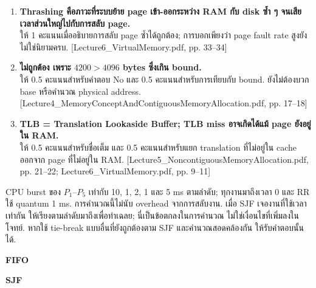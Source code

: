\begin{enumerate}[leftmargin=1.4em,start=6,itemsep=.25cm]
\item \textbf{Thrashing คือภาวะที่ระบบย้าย page เข้า-ออกระหว่าง RAM กับ disk ซ้ำ ๆ จนเสียเวลาส่วนใหญ่ไปกับการสลับ page.}\\ให้ 1 คะแนนเมื่ออธิบายการสลับ page ซ้ำได้ถูกต้อง; การบอกเพียงว่า page fault rate สูงยังไม่ใช่นิยามครบ. {\small [Lecture6\_VirtualMemory.pdf, pp. 33--34]}
\item \textbf{ไม่ถูกต้อง เพราะ $4200>4096$ bytes ซึ่งเกิน bound.}\\ให้ 0.5 คะแนนสำหรับคำตอบ No และ 0.5 คะแนนสำหรับการเทียบกับ bound. ยังไม่ต้องบวก base หรือคำนวณ physical address. {\small [Lecture4\_MemoryConceptAndContiguousMemoryAllocation.pdf, pp. 17--18]}
\item \textbf{TLB = Translation Lookaside Buffer; TLB miss อาจเกิดได้แม้ page ยังอยู่ใน RAM.}\\ให้ 0.5 คะแนนสำหรับชื่อเต็ม และ 0.5 คะแนนสำหรับแยก translation ที่ไม่อยู่ใน cache ออกจาก page ที่ไม่อยู่ใน RAM. {\small [Lecture5\_NoncontiguousMemoryAllocation.pdf, pp. 21--22; Lecture6\_VirtualMemory.pdf, pp. 9--11]}
\end{enumerate}\newpage{}
\noindent CPU burst ของ $P_1$--$P_5$ เท่ากับ 10, 1, 2, 1 และ 5 ms ตามลำดับ; ทุกงานมาถึงเวลา 0 และ RR ใช้ quantum 1 ms. การคำนวณนี้ไม่นับ overhead จากการสลับงาน. เมื่อ SJF เจองานที่ใช้เวลาเท่ากัน ให้เรียงตามลำดับมาถึงเพื่อทำเฉลย; นี่เป็นข้อตกลงในการคำนวณ ไม่ใช่เงื่อนไขที่เพิ่มลงในโจทย์. หากใช้ tie-break แบบอื่นที่ยังถูกต้องตาม SJF และคำนวณสอดคล้องกัน ให้รับคำตอบนั้นได้.\par
\noindent\textbf{FIFO}
\begin{center}\end{center}
\noindent\textbf{SJF}
\begin{center}\end{center}
